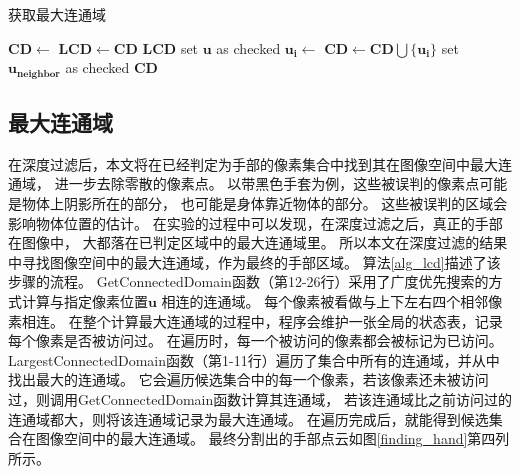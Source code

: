 \begin{algorithm}
    \caption{获取最大连通域}
    \label{alg_lcd}
    \begin{algorithmic}[1]
        \rm
                    \State $\bm{CD} \gets$ 
                        \State $\bm{LCD} \gets  \bm{CD}$
                    \EndIf
                \EndIf
            \EndFor
            \State \Return $\bm{LCD}$
        \EndFunction
            \State {}
            \State set $\bm{u}$ as checked
                \State $\bm{u_i} \gets$ 
                \State $\bm{CD} \gets \bm{CD} \bigcup \{\bm{u_i}\}$
                        \State {}
                        \State set $\bm{u_{neighbor}}$ as checked
                    \EndIf
                \EndFor
            \EndWhile
            \State \Return $\bm{CD}$
        \EndFunction
    \end{algorithmic}
\end{algorithm}
\subsection{最大连通域}
在深度过滤后，本文将在已经判定为手部的像素集合中找到其在图像空间中最大连通域，
进一步去除零散的像素点。
以带黑色手套为例，这些被误判的像素点可能是物体上阴影所在的部分，
也可能是身体靠近物体的部分。
这些被误判的区域会影响物体位置的估计。
在实验的过程中可以发现，在深度过滤之后，真正的手部在图像中，
大都落在已判定区域中的最大连通域里。
所以本文在深度过滤的结果中寻找图像空间中的最大连通域，作为最终的手部区域。
算法\ref{alg_lcd}描述了该步骤的流程。
GetConnectedDomain函数（第12-26行）采用了广度优先搜索的方式计算与指定像素位置$\bm{u}$
相连的连通域。
每个像素被看做与上下左右四个相邻像素相连。
在整个计算最大连通域的过程中，程序会维护一张全局的状态表，记录每个像素是否被访问过。
在遍历时，每一个被访问的像素都会被标记为已访问。
LargestConnectedDomain函数（第1-11行）遍历了集合中所有的连通域，并从中找出最大的连通域。
它会遍历候选集合中的每一个像素，若该像素还未被访问过，则调用GetConnectedDomain函数计算其连通域，
若该连通域比之前访问过的连通域都大，则将该连通域记录为最大连通域。
在遍历完成后，就能得到候选集合在图像空间中的最大连通域。
最终分割出的手部点云如图\ref{finding_hand}第四列所示。

